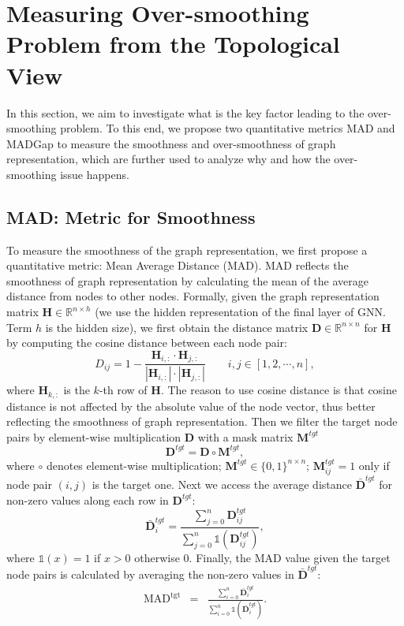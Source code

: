 \documentclass[letterpaper]{article} \usepackage{aaai20}  \usepackage{times}  \usepackage{helvet} \usepackage{courier}  \usepackage[hyphens]{url}  \usepackage{graphicx} \urlstyle{rm} \def\UrlFont{\rm}  \frenchspacing  \setlength{\pdfpagewidth}{8.5in}  \setlength{\pdfpageheight}{11in}  \setcounter{secnumdepth}{0}
\begin{document}
\section{Measuring Over-smoothing Problem from the Topological View}
In this section, we aim to investigate what is the key factor leading to the over-smoothing problem. To this end, we propose two quantitative metrics MAD and MADGap to measure the smoothness and over-smoothness of graph representation, which are further used to analyze why and how the over-smoothing issue happens.\subsection{MAD: Metric for Smoothness}
To measure the smoothness of the graph representation, we first propose a quantitative metric: Mean Average Distance (MAD). MAD reflects the smoothness of graph representation by calculating the mean of the average distance from nodes to other nodes. Formally, given the graph representation matrix $\bm{H} \in \mathbb{R}^{n \times h}$ (we use the hidden representation of the final layer of GNN. Term $h$ is the hidden size), we first obtain the distance matrix $\bm{D} \in \mathbb{R}^{n\times n}$ for $\bm{H}$ by computing the cosine distance between each node pair:
\begin{equation}
    D_{ij} = 1 - \frac{\bm{H}_{i,:} \cdot \bm{H}_{j,:}}{|\bm{H}_{i,:}| \cdot |\bm{H}_{j,:}|}\qquad i,j \in [1,2,\cdots,n],
\end{equation}
where $\bm{H}_{k,:}$ is the $k$-th row of $\bm{H}$.
The reason to use cosine distance is that cosine distance is not affected by the absolute value of the node vector, thus better reflecting the smoothness of graph representation. 
Then we filter the target node pairs by element-wise multiplication $\bm{D}$ with a mask matrix $\bm{M}^{tgt}$
\begin{equation}
 \bm{D}^{tgt} = \bm{D} \circ \bm{M}^{tgt},
\end{equation}
where $\circ$ denotes element-wise multiplication; $\bm{M}^{tgt}\in \{0,1\}^{n\times n}$; $\bm{M}^{tgt}_{ij}=1$ only if node pair $(i,j)$ is the target one. Next we access the average distance $\bar{\bm{D}}^{tgt}$ for non-zero values along each row in $\bm{D}^{tgt}$:
\begin{equation}
    \bar{\bm{D}}^{tgt}_i = \frac{\sum_{j=0}^n \bm{D}^{tgt}_{ij}}{\sum_{j=0}^n \mathds{1}\left( {\bm{D}}^{tgt}_{ij}\right)},
\end{equation}
where $\mathds{1}(x)=1$ if $x>0$ otherwise $0$.
Finally, the MAD value given the target node pairs is calculated by averaging the non-zero values in $\bar{\bm{D}}^{tgt}$:
\begin{eqnarray}
 \mathrm{MAD^{tgt}} &=& \frac{\sum_{i=0}^n \bar{\bm{D}}^{tgt}_{i}}{\sum_{i=0}^n \mathds{1}\left(\bar {\bm{D}}^{tgt}_{i}\right)}.
\end{eqnarray}
\end{document}
